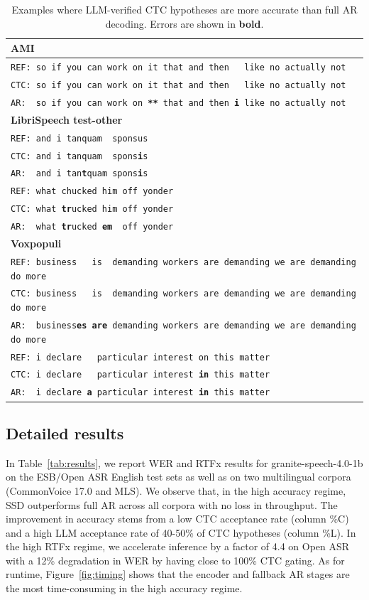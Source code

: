 \documentclass[cameraready]{Interspeech}
\begin{document}
\begin{table}
\centering
\caption{Examples where LLM-verified CTC hypotheses are more accurate than full AR decoding.
Errors are shown in \textbf{bold}.}
\label{tab:examples}
\tiny
\begin{tabular}{l}
\toprule
\textbf{AMI} \\
\midrule
\texttt{REF: so if you can work on it that and then ~~like no actually not} \\
\texttt{CTC: so if you can work on it that and then ~~like no actually not} \\
\texttt{AR:~ so if you can work on \textbf{**} that and then \textbf{i} like no actually not} \\
\midrule
\textbf{LibriSpeech test-other} \\
\midrule
\texttt{REF: and i~tanquam ~sponsus} \\
\texttt{CTC: and i~tanquam ~spons\textbf{i}s} \\
\texttt{AR:~ and i~tan\textbf{t}quam spons\textbf{i}s} \\
\midrule
\texttt{REF: what chucked him off yonder} \\
\texttt{CTC: what \textbf{tr}ucked him off yonder} \\
\texttt{AR:~ what \textbf{tr}ucked \textbf{em}~~off yonder} \\
\midrule
\textbf{Voxpopuli} \\
\midrule
\texttt{REF: business~~ is ~demanding workers are demanding we are demanding do more} \\
\texttt{CTC: business~~ is ~demanding workers are demanding we are demanding do more}\\
\texttt{AR:~ business\textbf{es} \textbf{are} demanding workers are demanding we are demanding do more}\\
\midrule
\texttt{REF: i declare ~~particular interest on this matter} \\
\texttt{CTC: i declare ~~particular interest \textbf{in} this matter} \\
\texttt{AR:~ i declare \textbf{a} particular interest \textbf{in} this matter} \\

\bottomrule
\end{tabular}
\end{table}

\subsection{Detailed results}
In Table~\ref{tab:results}, we report WER and RTFx results for granite-speech-4.0-1b on the ESB/Open ASR English test sets as well as on two multilingual corpora (CommonVoice 17.0 and MLS). We observe that, in the high accuracy regime, SSD outperforms full AR across all corpora with no loss in throughput. The improvement in accuracy stems from a low CTC acceptance rate (column \%C) and a high LLM acceptance rate of 40-50\% of CTC hypotheses (column \%L). In the high RTFx regime, we accelerate inference by a factor of 4.4 on Open ASR with a 12\% degradation in WER by having close to 100\% CTC gating. As for runtime, Figure~\ref{fig:timing} shows that the encoder and fallback AR stages are the most time-consuming in the high accuracy regime.
\end{document}
